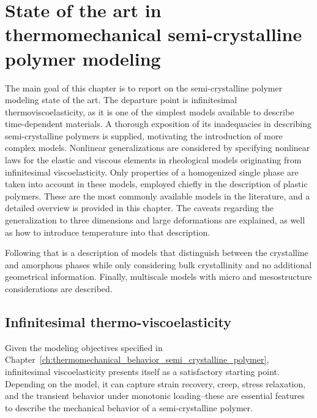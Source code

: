 \chapter{State of the art in thermomechanical semi-crystalline polymer modeling} \label{ch:modeling_semi_crystalline_polymer}

The main goal of this chapter is to report on the semi-crystalline polymer modeling state of the art.
The departure point is infinitesimal thermoviscoelasticity, as it is one of the simplest models available to describe time-dependent materials.
A thorough exposition of its inadequacies in describing semi-crystalline polymers is supplied, motivating the introduction of more complex models.
Nonlinear generalizations are considered by specifying nonlinear laws for the elastic and viscous elements in rheological models originating from infinitesimal viscoelasticity.
Only properties of a homogenized single phase are taken into account in these models, employed chiefly in the description of plastic polymers.
These are the most commonly available models in the literature, and a detailed overview is provided in this chapter.
The caveats regarding the generalization to three dimensions and large deformations are explained, as well as how to introduce temperature into that description.

Following that is a description of models that distinguish between the crystalline and amorphous phases while only considering bulk crystallinity and no additional geometrical information.
Finally, multiscale models with micro and mesostructure considerations are described.

\section{Infinitesimal thermo-viscoelasticity}
\label{sec:infinitesimal_thermo_viscoelasticity}
Given the modeling objectives specified in Chapter~\ref{ch:thermomechanical_behavior_semi_crystalline_polymer}, infinitesimal viscoelasticity presents itself as a satisfactory starting point.
Depending on the model, it can capture strain recovery, creep, stress relaxation, and the transient behavior under monotonic loading--these are essential features to describe the mechanical behavior of a semi-crystalline polymer.

